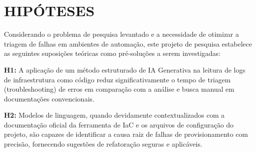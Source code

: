 \section{HIPÓTESES}

Considerando o problema de pesquisa levantado e a necessidade de otimizar a triagem de falhas em ambientes de automação, este projeto de pesquisa estabelece as seguintes suposições teóricas como pré-soluções a serem investigadas:

\textbf{H1:} A aplicação de um método estruturado de IA Generativa na leitura de logs de infraestrutura como código reduz significativamente o tempo de triagem (troubleshooting) de erros em comparação com a análise e busca manual em documentações convencionais.

\textbf{H2:} Modelos de linguagem, quando devidamente contextualizados com a documentação oficial da ferramenta de IaC e os arquivos de configuração do projeto, são capazes de identificar a causa raiz de falhas de provisionamento com precisão, fornecendo sugestões de refatoração seguras e aplicáveis.
